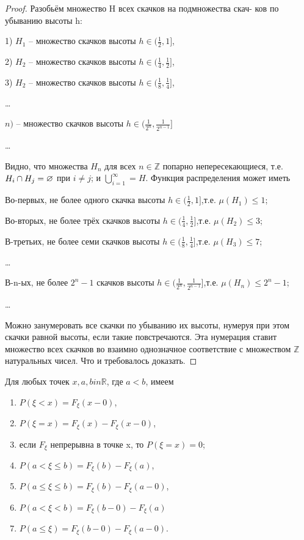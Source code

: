 \begin{proof}
	Разобьём множество H всех скачков на подмножества скач-
ков по убыванию высоты h:
	
	1) $H_1$ – множество скачков высоты $h\in(\frac{1}{2},1]$,

	2)  $H_2$ – множество скачков высоты $h\in(\frac{1}{4},\frac{1}{2}]$,

	3) $H_2$ – множество скачков высоты $h\in(\frac{1}{8},\frac{1}{4}]$,

	\dots

	$n)$ – множество скачков высоты $h\in(\frac{1}{2^n},\frac{1}{2^{n-1}}]$

	\dots



Видно, что множества $H_n$ для всех $n\in\mathbb{Z}$ попарно непересекающиеся, т.е.
$H_i \cap H_j=\varnothing$  при $i\neq j$; и $\bigcup\limits_{i=1}^{\infty}=H$.
Функция распределения может иметь

Во-первых, 	не более одного  скачка высоты $h\in(\frac{1}{2},1]$,т.е. 
$\mu(H_1)\leqslant 1$;

Во-вторых, 	не более трёх  скачков высоты $h\in(\frac{1}{4},\frac{1}{2}]$,т.е. 
$\mu(H_2)\leqslant 3$;

В-третьих, 	не более семи  скачков высоты $h\in(\frac{1}{8},\frac{1}{4}]$,т.е. 
$\mu(H_3)\leqslant 7$;

\ldots

В-n-ых, не более $2^n-1$ скачков высоты $h\in(\frac{1}{2^n},\frac{1}{2^{n-1}}]$,т.е.
$\mu(H_n)\leqslant 2^n-1$;

\ldots

Можно занумеровать все скачки по убыванию их высоты, нумеруя при
этом скачки равной высоты, если такие повстречаются. Эта нумерация ставит
множество всех скачков во взаимно однозначное соответствие с множеством
$\mathbb{Z}$ натуральных чисел. Что и требовалось доказать.

\end{proof}

\begin{theorem}
	Для любых точек $x,a,bin\mathbb{R}$, где $a<b$, имеем 
	\newline
	\begin{enumerate}
		\item $P(\xi<x)=F_{\xi}(x-0)$,
		\item $P(\xi=x)=F_{\xi}(x)-F_{\xi}(x-0)$,
		\item если $F_{\xi}$ непрерывна в точке x, то $P(\xi = x) = 0$;
		\item  $P(a<\xi\leqslant b)=F_{\xi}(b)-F_{\xi}(a)$,
		\item $P(a\leqslant\xi\leqslant b)=F_{\xi}(b)-F_{\xi}(a-0)$,
		\item $P(a<\xi<b)=F_{\xi}(b-0)-F_{\xi}(a)$
		\item $P(a\leqslant\xi)=F_{\xi}(b-0)-F_{\xi}(a-0)$.
	\end{enumerate}
\end{theorem}

